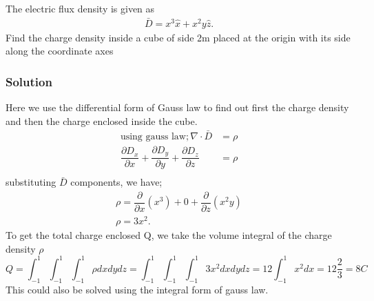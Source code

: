 \begin{exmp}
The electric flux density is given as
\begin{align*}
\bar{D}=x^{3}\hat{x} + x^{2}y\hat{z}.
\end{align*}
Find the charge density inside a cube of side 2m placed at the origin with its side along the coordinate axes

\subsubsection*{Solution}
Here we use the differential form of Gauss law to find out first the charge density and then the charge enclosed inside the cube.\\
\begin{align*}
\text{using gauss law}; \nabla\cdot\bar{D}&=\rho\\
\dfrac{\partial D_{x}}{\partial x}+\dfrac{\partial D_{y}}{\partial y}+\dfrac{\partial 
D_{z}}{\partial z}&=\rho \\
\end{align*}
substituting $\bar{D}$ components, we have;
\begin{align*}
\rho= \dfrac{\partial}{\partial x}(x^{3})+ 0 +\dfrac{\partial }{\partial z}(x^{2}y)\\
\rho=3x^{2} .
\end{align*}
To get the total charge enclosed Q, we take the volume integral of the charge density $\rho$
\begin{dmath*}
Q=\int_{-1}^{1}\int_{-1}^{1}\int_{-1}^{1}\rho dxdydz
=\int_{-1}^{1}\int_{-1}^{1}\int_{-1}^{1}3x^{2}dxdydz
=12\int_{-1}^{1}x^{2}dx= 12\frac{2}{3}
= 8 C
\end{dmath*}
This could also be solved using the integral form of gauss law.
\end{exmp}

